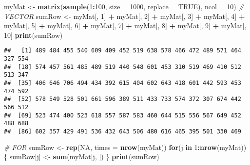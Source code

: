 \documentclass[]{book}
\newenvironment{Shaded}{\begin{snugshade}}{\end{snugshade}}
\newcommand{\KeywordTok}[1]{\textcolor[rgb]{0.13,0.29,0.53}{\textbf{#1}}}
\newcommand{\DataTypeTok}[1]{\textcolor[rgb]{0.13,0.29,0.53}{#1}}
\newcommand{\DecValTok}[1]{\textcolor[rgb]{0.00,0.00,0.81}{#1}}
\newcommand{\StringTok}[1]{\textcolor[rgb]{0.31,0.60,0.02}{#1}}
\newcommand{\CommentTok}[1]{\textcolor[rgb]{0.56,0.35,0.01}{\textit{#1}}}
\newcommand{\OtherTok}[1]{\textcolor[rgb]{0.56,0.35,0.01}{#1}}
\newcommand{\ControlFlowTok}[1]{\textcolor[rgb]{0.13,0.29,0.53}{\textbf{#1}}}
\newcommand{\OperatorTok}[1]{\textcolor[rgb]{0.81,0.36,0.00}{\textbf{#1}}}
\newcommand{\NormalTok}[1]{#1}
\theoremstyle{definition}
\theoremstyle{definition}
\theoremstyle{definition}
\theoremstyle{remark}
\begin{document}
\begin{Shaded}
\begin{Highlighting}[]
\NormalTok{myMat <-}\StringTok{ }\KeywordTok{matrix}\NormalTok{(}\KeywordTok{sample}\NormalTok{(}\DecValTok{1}\OperatorTok{:}\DecValTok{100}\NormalTok{, }\DataTypeTok{size =} \DecValTok{1000}\NormalTok{, }\DataTypeTok{replace =} \OtherTok{TRUE}\NormalTok{), }\DataTypeTok{ncol =} \DecValTok{10}\NormalTok{)}
\CommentTok{# VECTOR}
\NormalTok{sumRow <-}\StringTok{ }\NormalTok{myMat[, }\DecValTok{1}\NormalTok{] }\OperatorTok{+}\StringTok{ }\NormalTok{myMat[, }\DecValTok{2}\NormalTok{] }\OperatorTok{+}\StringTok{ }\NormalTok{myMat[, }\DecValTok{3}\NormalTok{] }\OperatorTok{+}\StringTok{ }\NormalTok{myMat[, }\DecValTok{4}\NormalTok{] }\OperatorTok{+}\StringTok{ }
\StringTok{  }\NormalTok{myMat[, }\DecValTok{5}\NormalTok{] }\OperatorTok{+}\StringTok{ }\NormalTok{myMat[, }\DecValTok{6}\NormalTok{] }\OperatorTok{+}\StringTok{ }\NormalTok{myMat[, }\DecValTok{7}\NormalTok{] }\OperatorTok{+}\StringTok{ }\NormalTok{myMat[, }\DecValTok{8}\NormalTok{] }\OperatorTok{+}\StringTok{ }
\StringTok{  }\NormalTok{myMat[, }\DecValTok{9}\NormalTok{] }\OperatorTok{+}\StringTok{ }\NormalTok{myMat[, }\DecValTok{10}\NormalTok{]}
\KeywordTok{print}\NormalTok{(sumRow)}
\end{Highlighting}
\end{Shaded}

\begin{verbatim}
##   [1] 489 484 455 540 609 409 452 519 638 578 466 472 489 571 464 327 554
##  [18] 574 457 561 485 489 519 440 548 601 453 310 519 469 410 512 513 347
##  [35] 406 646 706 494 434 392 615 404 602 643 418 601 442 593 453 474 592
##  [52] 578 549 528 501 661 596 389 511 433 733 574 372 307 674 442 566 512
##  [69] 523 474 400 523 618 557 587 583 460 644 515 556 567 649 452 488 688
##  [86] 602 357 429 491 536 432 643 506 480 616 465 395 501 330 469
\end{verbatim}

\begin{Shaded}
\begin{Highlighting}[]
\CommentTok{# FOR}
\NormalTok{sumRow <-}\StringTok{ }\KeywordTok{rep}\NormalTok{(}\OtherTok{NA}\NormalTok{, }\DataTypeTok{times =} \KeywordTok{nrow}\NormalTok{(myMat))}
\ControlFlowTok{for}\NormalTok{(j }\ControlFlowTok{in} \DecValTok{1}\OperatorTok{:}\KeywordTok{nrow}\NormalTok{(myMat))\{}
\NormalTok{  sumRow[j] <-}\StringTok{ }\KeywordTok{sum}\NormalTok{(myMat[j, ])}
\NormalTok{\}}
\KeywordTok{print}\NormalTok{(sumRow)}
\end{Highlighting}
\end{Shaded}
\end{document}
